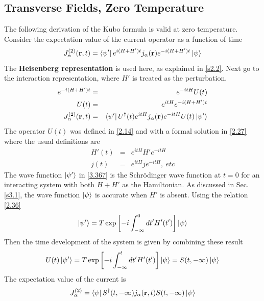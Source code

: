 \subsection{Transverse Fields, Zero Temperature}
The following derivation of the Kubo formula is valid at zero temperature.
Consider the expectation value of the current operator as a function of time
\begin{equation}
    J_\alpha^{(2)}(\mathbf{r},t) = \bra{\psi'} e^{i(H+H')t} j_\alpha(\mathbf{r}) e^{-i(H+H')t}  \ket{\psi}    \label{3.367}
\end{equation}
The \textbf{Heisenberg representation} is used here, as explained in \ref{s2.2}.
Next go to the interaction representation, where $H'$ is treated as the perturbation.
\begin{eqnarray}
    e^{-i(H+H')t} &=& e^{-itH}U(t)  \label{3.368}   \\
    U(t) &=& e^{itH} e^{-i(H+H')t}  \label{3.369}   \\
    J^{(2)}_\alpha (\mathbf{r},t) &=& \bra{\psi'} U^\dagger(t) e^{itH} j_\alpha(\mathbf{r}) e^{-itH} U(t) \ket{\psi'}  \label{3.370}
\end{eqnarray}
The operator $U(t)$ was defined in \eqref{2.14} and with a formal solution in \eqref{2.27} where the usual definitions are
\begin{eqnarray}
    H'(t) &=& e^{itH} H' e^{-itH}   \label{3.372}   \\
    j(t) &=& e^{itH} j e^{-itH},~ etc     \label{3.373}
\end{eqnarray}
The wave function $\ket{\psi'}$ in \eqref{3.367} is the Schr{\"o}dinger wave function at $t=0$ for an interacting system with both $H+H'$ as the Hamiltonian.
As discussed in Sec.\ref{s3.1}, the wave function $\ket{\psi}$ is accurate when $H'$ is absent.
Using the relation \eqref{2.36}
\begin{equation}
    \ket{\psi'} = T \exp \left[ -i \int_{-\infty}^0 dt' H'(t') \right] \ket{\psi}    \label{3.374}
\end{equation}
Then the time development of the system is given by combining these result
\begin{equation}
    U(t) \ket{\psi'} = T \exp \left[ -i \int_{-\infty}^t dt' H'(t') \right] \ket{\psi} = S(t,-\infty) \ket{\psi}    \label{3.376}
\end{equation}
The expectation value of the current is
\begin{equation}
    J_\alpha^{(2)} = \bra{\psi} S^\dagger(t,-\infty) j_\alpha(\mathbf{r},t) S(t,-\infty) \ket{\psi}    \label{3.377}
\end{equation}

